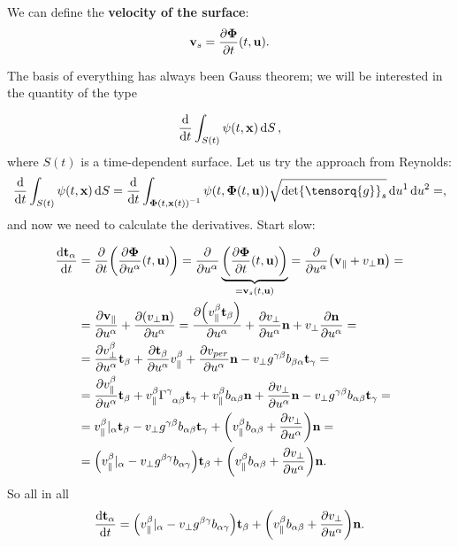 \documentclass[reqno, a4paper]{article}
\begin{document}
We can define the \textbf{velocity of the surface}:
\begin{equation*}
	\vb{v}_s = \pdv{\vb*{\Phi}}{t}\qty(t,\vb{u}).
\end{equation*}

The basis of everything has always been Gauss theorem; we will be interested in the quantity of the type

\[
	\dv{t} \int_{S(t)}\psi\qty(t,\vb{x})\dd{S},
\]
where $S(t)$ is a time-dependent surface. Let us try the approach from Reynolds:
\[
	\dv{t} \int_{S(t)}\psi\qty(t,\vb{x})\dd{S} = \dv{t} \int_{\inverse{\vb*{\Phi}\qty(t,\vb{x}(t))}}\psi(t,\vb*{\Phi}(t,\vb{u})) \sqrt{\det \tensorq{g}_s}\dd{u^1} \dd{u^2} = ,
\]
and now we need to calculate the derivatives. Start slow:

\begin{align*}
	\dv{\vb{t}_{\alpha}}{t} &= \pdv{t}\qty(\pdv{\vb{\Phi}}{u^\alpha}\qty(t,\vb{u})) = \pdv{u^{\alpha}}\underbrace{\qty(\pdv{\vb{\Phi}}{t}\qty(t,\vb{u}))}_{= \vb{v}_s(t,\vb{u})} = \pdv{u^{\alpha}}\qty(\vb{v}_{\parallel}+v_{\perp}\vb{n}) = \\
				&= \pdv{\vb{v}_{\parallel}}{u^{\alpha}}+\pdv{\qty(v_{\perp} \vb{n})}{u^{\alpha}} = \pdv{\qty(v^{\beta}_{\parallel}\vb{t}_{\beta})}{u^{\alpha}}+\pdv{v_{\perp}}{u^{\alpha}}\vb{n}+ v_{\perp} \pdv{\vb{n}}{u^{\alpha}} = \\
				&=\pdv{v_{\perp}^{\beta}}{u^{\alpha}}\vb{t}_{\beta}+\pdv{\vb{t}_{\beta}}{u^{\alpha}}v^{\beta}_{\parallel}+\pdv{v_{per}}{u^{\alpha}}\vb{n} - v_{\perp} g^{\gamma \beta}b_{\beta \alpha}\vb{t}_{\gamma} = \\
				& = \pdv{v^{\beta}_{\parallel}}{u^{\alpha}}\vb{t}_{\beta}+v^{\beta}_{\parallel}\Gamma \indices{^{\gamma}_{\alpha \beta}} \vb{t}_{\gamma}+ v_{\parallel}^{\beta}b_{\alpha \beta} \vb{n} + \pdv{v_{\perp}}{u^{\alpha}}\vb{n}- v_{\perp}g^{\gamma \beta}b_{\alpha \beta}\vb{t}_{\gamma} =\\
				& = v^{\beta}_{\parallel}|_{\alpha} \vb{t}_{\beta}- v_{\perp}g^{\gamma \beta} b_{\alpha \beta}\vb{t}_{\gamma}+\qty(v^{\beta}_{\parallel}b_{\alpha \beta}+ \pdv{v_{\perp}}{u^{\alpha}})\vb{n} = \\
				& = \qty(v_{\parallel}^{\beta}|_{\alpha}-v_{\perp}g^{\beta \gamma} b_{\alpha \gamma})\vb{t}_{\beta}+ \qty(v_{\parallel}^{\beta}b_{\alpha \beta} + \pdv{v_{\perp}}{u^{\alpha}})\vb{n}.
\end{align*}
So all in all
\[
	\dv{\vb{t}_{\alpha}}{t}= \qty(v_{\parallel}^{\beta}|_{\alpha}-v_{\perp}g^{\beta \gamma} b_{\alpha \gamma})\vb{t}_{\beta}+ \qty(v_{\parallel}^{\beta}b_{\alpha \beta} + \pdv{v_{\perp}}{u^{\alpha}})\vb{n}.
\]
\end{document}
